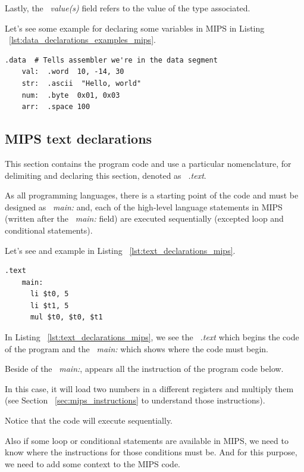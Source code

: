 \documentclass[
  oneside,
  11pt, a4paper,
  footinclude=true,
  headinclude=true,
  cleardoublepage=empty
]{scrbook}
\begin{document}
Lastly, the ~\textit{value(s)} field refers to the value of the type associated.

Let's see some example for declaring some variables in MIPS in Listing ~\ref{lst:data_declarations_examples_mips}.

\begin{lstlisting}[caption={Examples for declaring variables in MIPS},label={lst:data_declarations_examples_mips}]
  .data  # Tells assembler we're in the data segment
    val:  .word  10, -14, 30   
    str:  .ascii  "Hello, world"
    num:  .byte  0x01, 0x03
    arr:  .space 100
\end{lstlisting}


\subsection{MIPS text declarations}
This section contains the program code and use a particular nomenclature, for delimiting  and declaring this section, denoted as ~\textit{.text}.

As all programming languages, there is a starting point of the code and must be designed as ~\textit{main:} and, each of the high-level language statements in MIPS (written after the ~\textit{main:} field) are executed sequentially (excepted loop and conditional statements).

Let's see and example in Listing ~\ref{lst:text_declarations_mips}.

\begin{lstlisting}[caption={Example of Text declarations in MIPS},label={lst:text_declarations_mips}]
  .text 
    main:
      li $t0, 5
      li $t1, 5
      mul $t0, $t0, $t1
\end{lstlisting}

In Listing ~\ref{lst:text_declarations_mips}, we see the ~\textit{.text} which begins the code of the program and the ~\textit{main:} which shows where the code must begin.

Beside of the ~\textit{main:}, appears all the instruction of the program code below. 

In this case, it will load two numbers in a different registers and multiply them (see Section ~\ref{sec:mips_instructions} to understand those instructions). 

Notice that the code will execute sequentially.

Also if some loop or conditional statements are available in MIPS, we need to know where the instructions for those conditions must be.
And for this purpose, we need to add some context to the MIPS code.
\end{document}
